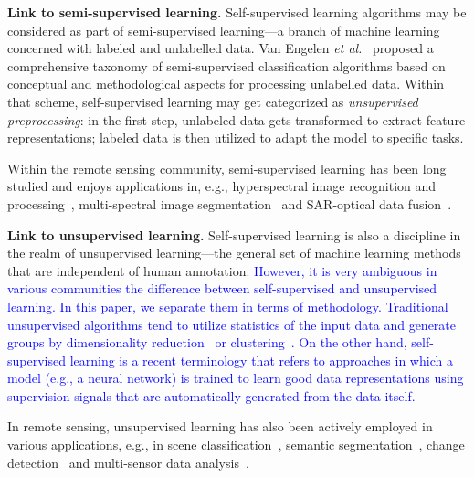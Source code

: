 \documentclass[lettersize,journal]{IEEEtran}
\newcommand{\etal}{\textit{et al.}}
\begin{document}
\textbf{Link to semi-supervised learning.} Self-supervised learning algorithms may be considered as part of semi-supervised learning---a branch of machine learning concerned with labeled and unlabelled data. Van Engelen \etal~\cite{van2020survey} proposed a comprehensive taxonomy of semi-supervised classification algorithms based on conceptual and methodological aspects for processing unlabelled data. Within that scheme, self-supervised learning may get categorized as \textit{unsupervised preprocessing}: in the first step, unlabeled data gets transformed to extract feature representations; labeled data is then utilized to adapt the model to specific tasks.

Within the remote sensing community, semi-supervised learning has been long studied and enjoys applications in, e.g., hyperspectral image recognition and processing~\cite{dopido2013semisupervised,ratle2010semisupervised,wang2018self,hong2019wu,hong2019learning,hong2020joint,cao2020sdfl,cao20203d,li2020deep,yue2021self}, multi-spectral image segmentation~\cite{hong2019cospace,hong2019learnable,hong2020x,hu2020unsupervised,hua2021semantic,hua2021aerial,saha2020semisupervised} and SAR-optical data fusion~\cite{hu2019mima}.



\textbf{Link to unsupervised learning.} Self-supervised learning is also a discipline in the realm of unsupervised learning---the general set of machine learning methods that are independent of human annotation. \textcolor{blue}{However, it is very ambiguous in various communities the difference between self-supervised and unsupervised learning. In this paper, we separate them in terms of methodology. Traditional unsupervised algorithms tend to utilize statistics of the input data and generate groups by dimensionality reduction~\cite{abdi2010principal,cheriyadat2013unsupervised} or clustering~\cite{jain1999data}. On the other hand, self-supervised learning is a recent terminology that refers to approaches in which a model (e.g., a neural network) is trained to learn good data representations using supervision signals that are automatically generated from the data itself.}

In remote sensing, unsupervised learning has also been actively employed in various applications, e.g., in scene classification~\cite{li2016unsupervisedrs,cheriyadat2013unsupervised,romero2015unsupervised}, semantic segmentation~\cite{bandyopadhyay2007multiobjective,fan2009single,saha2020unsupervised}, change detection~\cite{ghosh2011fuzzy,munyati2004use} and multi-sensor data analysis~\cite{zabalza2014novel,cao2003remote}. 
\end{document}
